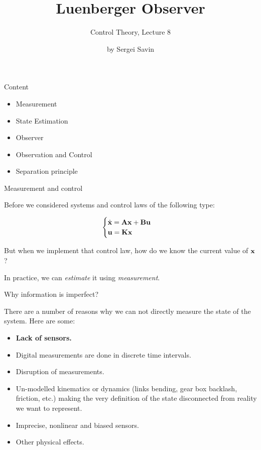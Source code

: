 \documentclass{beamer}
\title{Luenberger Observer}
\subtitle{Control Theory, Lecture 8}
\author{by Sergei Savin}
\date{\mydate}
\begin{document}
\maketitle



\begin{frame}{Content}
\begin{itemize}
\item Measurement
\item State Estimation
\item Observer
\item Observation and Control
\item Separation principle
\end{itemize}
\end{frame}




\begin{frame}{Measurement and control}
\begin{flushleft}

Before we considered systems and control laws of the following type:

\begin{equation}
\begin{cases}
\dot {\mathbf{x}} = \mathbf{A} \mathbf{x} + \mathbf{B} \mathbf{u}\\
\mathbf{u} = \mathbf{K} \mathbf{x}
\end{cases}
\end{equation}

But when we implement that control law, how do we know the current value of $\mathbf{x}$?

\bigskip

In practice, we can \emph{estimate} it using \emph{measurement}.

\end{flushleft}
\end{frame}

\begin{frame}{Why information is imperfect?}
\begin{flushleft}

There are a number of reasons why we can not directly measure the state of the system. Here are some:

\begin{itemize}
\item \textbf{Lack of sensors.}
\item Digital measurements are done in discrete time intervals.
\item Disruption of measurements.
\item Un-modelled kinematics or dynamics (links bending, gear box backlash, friction, etc.) making the very definition of the state disconnected from reality we want to represent.
\item Imprecise, nonlinear and biased sensors.
\item Other physical effects.
\end{itemize}

\end{flushleft}
\end{frame}
\end{document}
